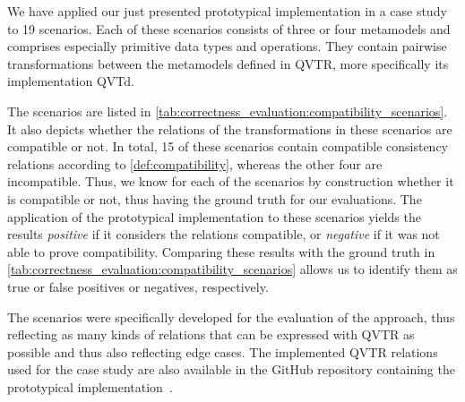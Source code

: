 We have applied our just presented prototypical implementation in a case study to 19 scenarios.
Each of these scenarios consists of three or four metamodels and comprises especially primitive data types and operations.
They contain pairwise transformations between the metamodels defined in \gls{QVTR}, more specifically its implementation \gls{QVTd}.

The scenarios are listed in \autoref{tab:correctness_evaluation:compatibility_scenarios}.
It also depicts whether the relations of the transformations in these scenarios are compatible or not.
In total, 15 of these scenarios contain compatible consistency relations according to \autoref{def:compatibility}, whereas the other four are incompatible.
Thus, we know for each of the scenarios by construction whether it is compatible or not, thus having the ground truth for our evaluations.
The application of the prototypical implementation to these scenarios yields the results \emph{positive} if it considers the relations compatible, or \emph{negative} if it was not able to prove compatibility.
Comparing these results with the ground truth in \autoref{tab:correctness_evaluation:compatibility_scenarios} allows us to identify them as true or false positives or negatives, respectively.

The scenarios were specifically developed for the evaluation of the approach, thus reflecting as many kinds of relations that can be expressed with \gls{QVTR} as possible and thus also reflecting edge cases.
The implemented \gls{QVTR} relations used for the case study are also available in the GitHub repository containing the prototypical implementation~\cite{decompositionGithub}.





